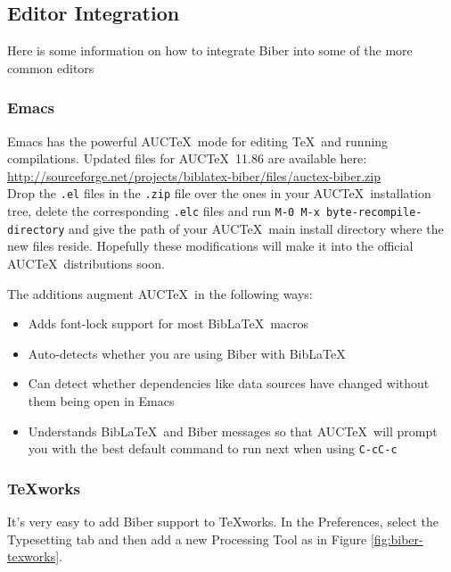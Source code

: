 \documentclass{ltxdockit}
\begin{document}
\subsection{Editor Integration}

Here is some information on how to integrate Biber into some of the
more common editors

\subsubsection{Emacs}

Emacs has the powerful AUC\TeX\ mode for editing \TeX\ and running
compilations. Updated files for AUC\TeX\ 11.86 are available here:\\[2ex]

\noindent\url{http://sourceforge.net/projects/biblatex-biber/files/auctex-biber.zip}\\[2ex]

\noindent Drop the \verb+.el+ files in the \verb+.zip+ file over the
ones in your AUC\TeX\ installation tree, delete the corresponding
\verb+.elc+ files and run \verb+M-0 M-x byte-recompile-directory+ and
give the path of your AUC\TeX\ main install directory where the new
files reside. Hopefully these modifications will make it into the
official AUC\TeX\ distributions soon.

The additions augment AUC\TeX\ in the following ways:

\begin{itemize}
\item Adds font-lock support for most Bib\LaTeX\ macros
\item Auto-detects whether you are using Biber with Bib\LaTeX\
\item Can detect whether dependencies like data sources have changed without
  them being open in Emacs
\item Understands Bib\LaTeX\ and Biber messages so that
  AUC\TeX\ will prompt you with the best default command to run next
  when using \verb+C-cC-c+
\end{itemize}

\subsubsection{\TeX works}

It's very easy to add Biber support to \TeX works. In the Preferences,
select the Typesetting tab and then add a new Processing Tool as in Figure
\ref{fig:biber-texworks}.
\end{document}
